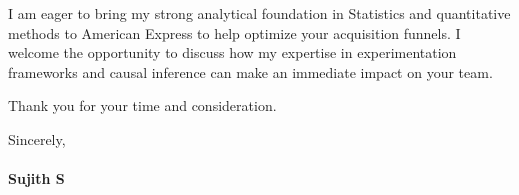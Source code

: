 \documentclass[a4paper,11pt]{article}
\begin{document}
I am eager to bring my strong analytical foundation in Statistics and quantitative methods to American Express to help optimize your acquisition funnels. I welcome the opportunity to discuss how my expertise in experimentation frameworks and causal inference can make an immediate impact on your team.

Thank you for your time and consideration.

Sincerely, \\
\vspace{5pt} \\
\textbf{Sujith S}
\end{document}
